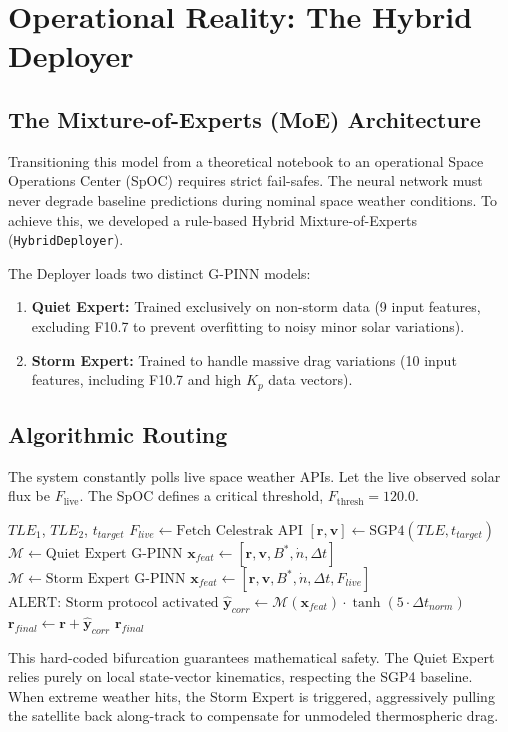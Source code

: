 \section{Operational Reality: The Hybrid Deployer}

\subsection{The Mixture-of-Experts (MoE) Architecture}
Transitioning this model from a theoretical notebook to an operational Space Operations Center (SpOC) requires strict fail-safes. The neural network must never degrade baseline predictions during nominal space weather conditions. To achieve this, we developed a rule-based Hybrid Mixture-of-Experts (\texttt{HybridDeployer}).

The Deployer loads two distinct G-PINN models:
\begin{enumerate}
    \item \textbf{Quiet Expert:} Trained exclusively on non-storm data (9 input features, excluding F10.7 to prevent overfitting to noisy minor solar variations).
    \item \textbf{Storm Expert:} Trained to handle massive drag variations (10 input features, including F10.7 and high $K_p$ data vectors).
\end{enumerate}

\subsection{Algorithmic Routing}
The system constantly polls live space weather APIs. Let the live observed solar flux be $F_{\text{live}}$. The SpOC defines a critical threshold, $F_{\text{thresh}} = 120.0$.
\begin{algorithm}[H]
\caption{Hybrid SpOC Routing}
\begin{algorithmic}[1]
\REQUIRE $TLE_1$, $TLE_2$, $t_{target}$
\STATE $F_{live} \leftarrow \text{Fetch Celestrak API}$
\STATE $[\mathbf{r}, \mathbf{v}] \leftarrow \text{SGP4}(TLE, t_{target})$
    \STATE $\mathcal{M} \leftarrow \text{Quiet Expert G-PINN}$
    \STATE $\mathbf{x}_{feat} \leftarrow [\mathbf{r}, \mathbf{v}, B^*, \dot{n}, \Delta t]$
\ELSE
    \STATE $\mathcal{M} \leftarrow \text{Storm Expert G-PINN}$
    \STATE $\mathbf{x}_{feat} \leftarrow[\mathbf{r}, \mathbf{v}, B^*, \dot{n}, \Delta t, F_{live}]$
    \STATE $\text{ALERT:} \text{ Storm protocol activated}$
\ENDIF
\STATE $\hat{\mathbf{y}}_{corr} \leftarrow \mathcal{M}(\mathbf{x}_{feat}) \cdot \tanh(5 \cdot \Delta t_{norm})$
\STATE $\mathbf{r}_{final} \leftarrow \mathbf{r} + \hat{\mathbf{y}}_{corr}$
\RETURN $\mathbf{r}_{final}$
\end{algorithmic}
\end{algorithm}

This hard-coded bifurcation guarantees mathematical safety. The Quiet Expert relies purely on local state-vector kinematics, respecting the SGP4 baseline. When extreme weather hits, the Storm Expert is triggered, aggressively pulling the satellite back along-track to compensate for unmodeled thermospheric drag.

